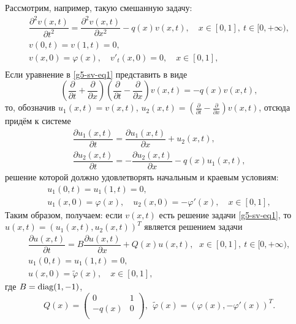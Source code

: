 Рассмотрим, например,    такую смешанную задачу:
\begin{equation}\label{g5-sv-eq1}
\begin{array}{c}
\dfrac{{{\partial }^{2}}v(x,t)}{\partial
{{t}^{2}}}=\dfrac{{{\partial }^{2}}v(x,t)}{\partial
{{x}^{2}}}-q(x)v(x,t), \quad x\in [0,1], \  t\in [0,+\infty),
\\
v(0,t)=v(1,t)=0, \quad  \\
 v(x,0)=\varphi (x),  \quad {{{v}'_{t}}}(x,0)=0,\quad x\in [0,1],
 \\
 \end{array}
\end{equation}
Если уравнение в \eqref{g5-sv-eq1}   представить в виде
$$
  \left(\frac{\partial}{\partial t }+ \frac{\partial}{\partial x
}\right)\left(\frac{\partial}{\partial t }- \frac{\partial}{\partial
x }\right)v(x,t)=-q(x)v(x,t),
$$
то, обозначив  $u_1(x,t)=v(x,t)$,  $u_2(x,t)=
\left(\frac{\partial}{\partial t }- \frac{\partial}{\partial x
}\right)v(x,t)$,  отсюда   придём к системе
$$ \begin{array}{l}
\dfrac{\partial u_1(x,t)}{\partial t}= \dfrac{\partial
u_1(x,t)}{\partial x}+u_2(x,t),   \\
\dfrac{\partial u_2(x,t)}{\partial t}= -\dfrac{\partial
u_2(x,t)}{\partial x}-q(x)u_1(x,t),
 \end{array}
$$
 решение которой должно удовлетворять начальным и
краевым условиям:
$$\begin{array}{c}
u_1(0,t)=u_1(1,t)=0, \quad     \\
 u_1(x,0)= {\varphi} (x),   \quad u_2(x,0)=-\varphi' (x), \quad x\in
 [0,1],
\end{array}$$
Таким образом, получаем: если $v(x,t)$ есть  решение задачи
\eqref{g5-sv-eq1}, то\\
   $u(x,t)=(u_1(x,t), u_2(x,t))^T$  является решением задачи
$$
	\begin{array}{c}
		\dfrac{\partial u(x,t)}{\partial t}=
		B\dfrac{\partial u(x,t)}{\partial x}+Q(x)u(x,t),
		\ \ \, x\in [0,1],\  t\in [0,+\infty),
	\\
	u_1(0,t)=u_1(1,t)=0,
	\\
	u  (x,0)= \widetilde{\varphi} (x),     \quad x\in [0,1],
	\end{array}
$$
 где
$B={\rm diag}(1,-1)$, $$Q(x)=\begin{pmatrix}
  0 & 1 \\
  -q(x) & 0 \\
\end{pmatrix}, \ \ \widetilde{\varphi} (x)=({\varphi} (x),-\varphi' (x))^T.$$







